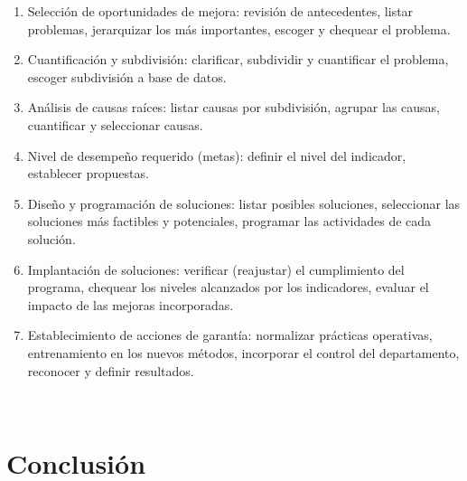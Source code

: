 {	\begin{enumerate}
	\item Selección de oportunidades de mejora: revisión de antecedentes, listar problemas, jerarquizar los más importantes, escoger y chequear el problema.
	\item Cuantificación y subdivisión: clarificar, subdividir y cuantificar el problema, escoger subdivisión a base de datos.
	\item Análisis de causas raíces: listar causas por subdivisión, agrupar las causas, cuantificar y seleccionar causas.
	\item Nivel de desempeño requerido (metas): definir el nivel del indicador, establecer propuestas.
	\item Diseño y programación de soluciones: listar posibles soluciones, seleccionar las soluciones más factibles y potenciales, programar las actividades de cada solución.
	\item Implantación de soluciones: verificar (reajustar) el cumplimiento del programa, chequear los niveles alcanzados por los indicadores, evaluar el impacto de las mejoras incorporadas.
	\item Establecimiento de acciones de garantía: normalizar prácticas operativas, entrenamiento en los nuevos métodos, incorporar el control del departamento, reconocer y definir resultados.
	\end{enumerate}
	
	
	\\

\section{Conclusión}

	\\
	
}
